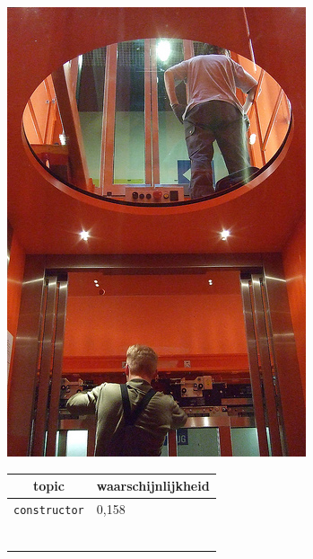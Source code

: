 \begin{figure}[h]
    \centering
    \begin{minipage}[t]{.5\linewidth}
    \centering
    \vspace{0pt}
    \includegraphics[width=\textwidth]{Images/LDA/2506703854.jpg}
    \end{minipage}\hfill
    \begin{minipage}[t]{.5\textwidth}
    \centering
    \vspace{0pt}
    \begin{tabularx}{\textwidth}{cl}
            topic                           & waarschijnlijkheid\\
            \hline
            \texttt{constructor} & 0,158\\
            \begin{tabular}{c}

\end{tabular}
\end{tabularx}
\end{minipage}
\end{figure}
